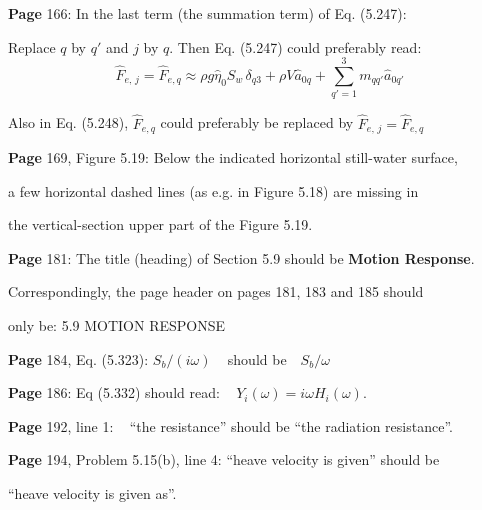 \documentclass[a4paper,12pt]{article}
\begin{document}
\noindent %
{\bf Page} 166: In the last term (the summation term) of Eq. (5.247): 

Replace $q$ by $q'$ and $j$ by $q$. Then Eq. (5.247) could preferably read:  
\vspace{-0.4cm}
      \begin{equation*} 
          \hat{F}_{e,\, j} = \hat{F}_{e,q} \approx \rho g \hat{\eta}_{0} S_w \, \delta_{q3}
          + \rho V \hat{a}_{0q} + \sum_{q'=1}^3 m_{qq'} \hat{a}_{0q'}
      \end{equation*}
\vspace{-0.4cm}

Also in Eq. (5.248), $\hat{F}_{e,q}$ could preferably be replaced by $\hat{F}_{e,\, j} = \hat{F}_{e,q}$ %
\vspace{0.2cm}

\noindent %
{\bf Page} 169, Figure 5.19:  Below the indicated horizontal still-water surface, 

a few horizontal dashed lines (as e.g. in Figure 5.18) are missing in 

the vertical-section upper part of the Figure 5.19. %
\vspace{0.2cm}

\noindent %
{\bf Page} 181:  The title (heading) of Section 5.9 should be {\bf Motion Response}. 

Correspondingly, the page header on pages 181, 183 and 185 should 

only be: 5.9 MOTION RESPONSE %
\vspace{0.2cm}

\noindent %
{\bf Page} 184, Eq. (5.323):  $S_b/(i\omega)$ \,\,\ should be \,\, $S_b/\omega$ %
\vspace{0.2cm}

\noindent %
{\bf Page} 186: Eq (5.332) should read: \,\,\, $Y_i(\omega) = i\omega H_i(\omega)$. %
\vspace{0.2cm}

\noindent %
{\bf Page} 192, line 1: \,\,\, ``the resistance'' should be ``the radiation resistance''. %
\vspace{0.2cm}


\noindent %
{\bf Page} 194, Problem 5.15(b), line 4:   
``heave velocity is given'' should be 

``heave velocity is given as''. %
\vspace{0.2cm}
\end{document}
